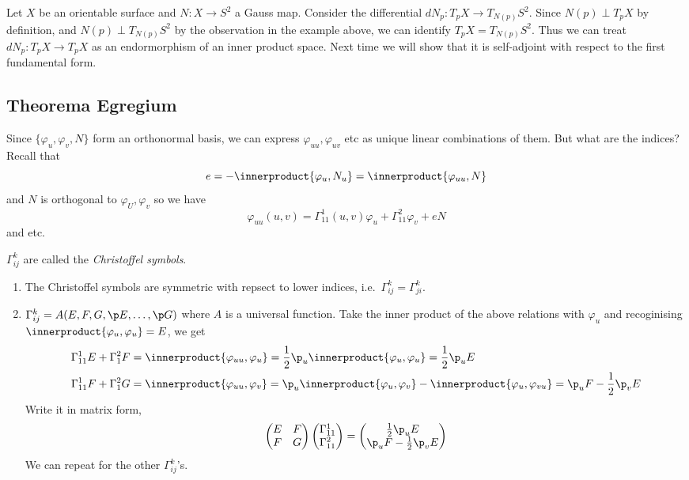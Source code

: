 \documentclass[a4paper]{article}
\newcommand*{\inner}{\innerproduct}
\begin{document}
Let \(X\) be an orientable surface and \(N: X \to S^2\) a Gauss map. Consider the differential \(dN_p: T_pX \to T_{N(p)}S^2\). Since \(N(p) \perp T_pX\) by definition, and \(N(p) \perp T_{N(p)} S^2\) by the observation in the example above, we can identify \(T_pX = T_{N(p)}S^2\). Thus we can treat \(dN_p: T_pX \to T_pX\) as an endormorphism of an inner product space. Next time we will show that it is self-adjoint with respect to the first fundamental form.


\blindtext

\subsection{Theorema Egregium}

Since \(\{\varphi_u, \varphi_v, N\}\) form an orthonormal basis, we can express \(\varphi_{uu}, \varphi_{uv}\) etc as unique linear combinations of them. But what are the indices? Recall that
\[
  e = - \inner{\varphi_u, N_u} = \inner{\varphi_{uu}, N}
\]
and \(N\) is orthogonal to \(\varphi_U, \varphi_v\) so we have
\[
  \varphi_{uu}(u, v) = \Gamma_{11}^1(u, v) \varphi_u + \Gamma_{11}^2 \varphi_v + eN
\]
and etc.

\begin{definition}
  \(\Gamma_{ij}^k\) are called the \emph{Christoffel symbols}.
\end{definition}

\begin{remark}\leavevmode
  \begin{enumerate}
  \item The Christoffel symbols are symmetric with repsect to lower indices, i.e.\ \(\Gamma_{ij}^k = \Gamma_{ji}^k\).
  \item \(\Gamma_{ij}^k = A(E, F, G, \p E, \dots, \p G)\) where \(A\) is a universal function. Take the inner product of the above relations with \(\varphi_u\) and recoginising \(\inner{\varphi_u, \varphi_u} = E\), we get
    \begin{align*}
      \Gamma_{11}^1 E + \Gamma_{1}^2 F &= \inner{\varphi_{uu}, \varphi_u} = \frac{1}{2} \p_u \inner{\varphi_u, \varphi_u} = \frac{1}{2} \p_u E \\
      \Gamma_{11}^1 F + \Gamma_{1}^2 G &= \inner{\varphi_{uu}, \varphi_v} = \p_u \inner{\varphi_u, \varphi_v} - \inner{\varphi_u, \varphi_{vu}} = \p_u F - \frac{1}{2} \p_v E
    \end{align*}
    Write it in matrix form,
    \[
      \begin{pmatrix}
        E & F \\
        F & G
      \end{pmatrix}
      \begin{pmatrix}
        \Gamma_{11}^1 \\
        \Gamma_{11}^2
      \end{pmatrix}
      =
      \begin{pmatrix}
        \frac{1}{2} \p_u E \\
        \p_u F - \frac{1}{2} \p_v E
      \end{pmatrix}
    \]
    We can repeat for the other \(\Gamma_{ij}^k\)'s.
  \end{enumerate}
\end{remark}
\end{document}
